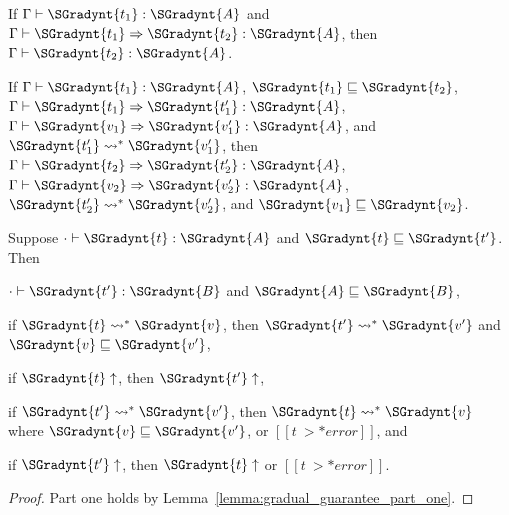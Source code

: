 \begin{lemma}
  \label{lemma:type_preservation_for_cast_insertion}
  If $ \Gamma  \vdash  \SGradynt{t_{{\mathrm{1}}}}  :  \SGradynt{A} $ and $ \Gamma  \vdash  \SGradynt{t_{{\mathrm{1}}}}  \Rightarrow  \SGradynt{t_{{\mathrm{2}}}}  :  \SGradynt{A} $, then $ \Gamma  \vdash  \SGradynt{t_{{\mathrm{2}}}}  :  \SGradynt{A} $.
\end{lemma}


\begin{lemma}
  \label{lemma:gradual_guarantee_part_two}
  If $ \Gamma  \vdash  \SGradynt{t_{{\mathrm{1}}}}  :  \SGradynt{A} $, $ \SGradynt{t_{{\mathrm{1}}}}  \sqsubseteq  \SGradynt{t_{{\mathrm{2}}}} $, $ \Gamma  \vdash  \SGradynt{t_{{\mathrm{1}}}}  \Rightarrow  \SGradynt{t'_{{\mathrm{1}}}}  :  \SGradynt{A} $, $ \Gamma  \vdash  \SGradynt{v_{{\mathrm{1}}}}  \Rightarrow  \SGradynt{v'_{{\mathrm{1}}}}  :  \SGradynt{A} $, and $ \SGradynt{t'_{{\mathrm{1}}}}  \rightsquigarrow^*  \SGradynt{v'_{{\mathrm{1}}}} $, then
  $ \Gamma  \vdash  \SGradynt{t_{{\mathrm{2}}}}  \Rightarrow  \SGradynt{t'_{{\mathrm{2}}}}  :  \SGradynt{A} $, $ \Gamma  \vdash  \SGradynt{v_{{\mathrm{2}}}}  \Rightarrow  \SGradynt{v'_{{\mathrm{2}}}}  :  \SGradynt{A} $, $ \SGradynt{t'_{{\mathrm{2}}}}  \rightsquigarrow^*  \SGradynt{v'_{{\mathrm{2}}}} $, and $ \SGradynt{v_{{\mathrm{1}}}}  \sqsubseteq  \SGradynt{v_{{\mathrm{2}}}} $.
\end{lemma}


\begin{theorem}
  \label{thm:gradual_guarantee}
  Suppose $  \cdot   \vdash  \SGradynt{t}  :  \SGradynt{A} $ and $ \SGradynt{t}  \sqsubseteq  \SGradynt{t'} $.  Then
  \begin{enumR}
  \item $  \cdot   \vdash  \SGradynt{t'}  :  \SGradynt{B} $ and $ \SGradynt{A}  \sqsubseteq  \SGradynt{B} $,
  \item if $ \SGradynt{t}  \rightsquigarrow^*  \SGradynt{v} $, then $ \SGradynt{t'}  \rightsquigarrow^*  \SGradynt{v'} $ and $ \SGradynt{v}  \sqsubseteq  \SGradynt{v'} $,
  \item if $ \SGradynt{t}  \uparrow $, then $ \SGradynt{t'}  \uparrow $,
  \item if $ \SGradynt{t'}  \rightsquigarrow^*  \SGradynt{v'} $, then $ \SGradynt{t}  \rightsquigarrow^*  \SGradynt{v} $ where $ \SGradynt{v}  \sqsubseteq  \SGradynt{v'} $, or $[[t ~>* error]]$, and
  \item if $ \SGradynt{t'}  \uparrow $, then $ \SGradynt{t}  \uparrow $ or $[[t ~>* error]]$.
  \end{enumR}
\end{theorem}
\begin{proof}
  Part one holds by Lemma~\ref{lemma:gradual_guarantee_part_one}.
\end{proof}

